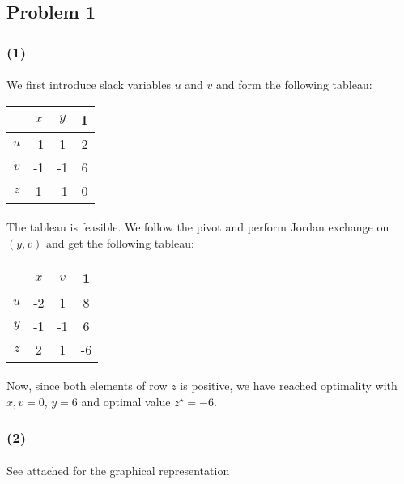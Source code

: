 \subsection*{Problem 1}
\subsubsection*{(1)}
\paragraph{}
We first introduce slack variables $u$ and $v$ and form the following tableau:
\begin{center}
	\begin{tabular}{ c | c  c | c }
		\hline
		\ &  $x$  & $y$ & 1\\ \hline
		$u$ & -1 &  1 & 2\\ 
		$v$ & -1 & -1 & 6\\ \hline
		$z$ &  1 & -1 & 0\\
		\hline
	\end{tabular}
\end{center}
\paragraph{}
The tableau is feasible. We follow the pivot and perform Jordan exchange on $(y, v)$ and get the following tableau:
\begin{center}
	\begin{tabular}{ c | c  c | c }
		\hline
		\ &  $x$  & $v$ &  1\\ \hline
		$u$ & -2 &  1 &  8\\ 
		$y$ & -1 & -1 &  6\\ \hline
		$z$ &  2 &  1 & -6\\
		\hline
	\end{tabular}
\end{center}
\paragraph{}
Now, since both elements of row $z$ is positive, we have reached optimality with $x, v=0$, $y=6$ and optimal value $z^\star =-6$.
\subsubsection*{(2)}
\paragraph{}
See attached for the graphical representation
